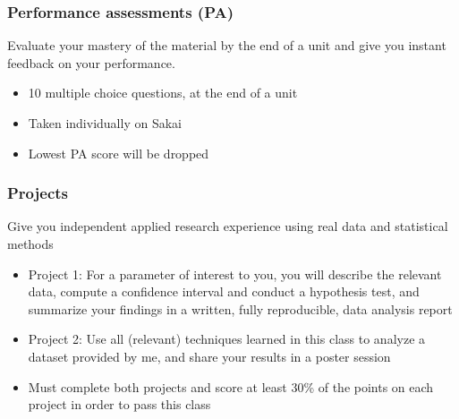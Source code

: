 \documentclass[slidestop,compress,mathserif,12pt,t,professionalfonts,xcolor=table]{beamer}
\begin{document}
\begin{frame}
\frametitle{Performance assessments (PA)}

 Evaluate your mastery of the material by the end of a unit and give you instant feedback on your performance.

\begin{itemize}

\item 10 multiple choice questions, at the end of a unit

\item Taken individually on Sakai

\item Lowest PA score will be dropped

\end{itemize}


\end{frame}


\begin{frame}
\frametitle{Projects}

 Give you independent applied research experience using real data and statistical methods

\begin{itemize}

\item Project 1: For a parameter of interest to you, you will describe the relevant data, compute a confidence interval and conduct a hypothesis test, and summarize your findings in a written, fully reproducible, data analysis report

\item Project 2: Use all (relevant) techniques learned in this class to analyze a dataset provided by me, and share your results in a poster session

\item Must complete both projects and score at least 30\% of the points on each project in order to pass this class

\end{itemize}


\end{frame}
\end{document}
